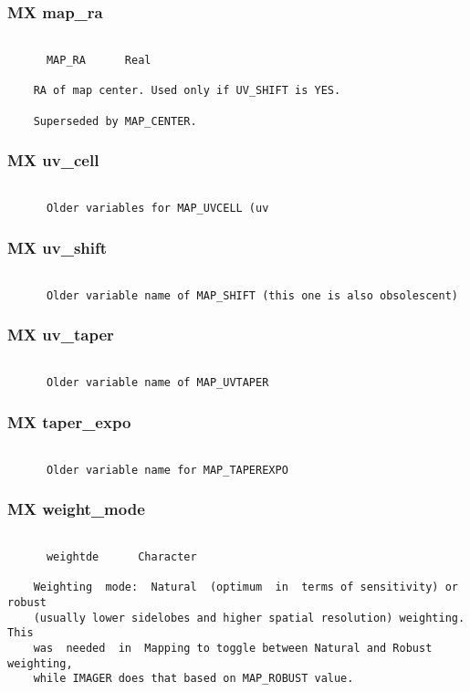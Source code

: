 \subsubsection{MX map\_ra}
\begin{verbatim}

      MAP_RA      Real

    RA of map center. Used only if UV_SHIFT is YES.

    Superseded by MAP_CENTER.

\end{verbatim}
\subsubsection{MX uv\_cell}
\begin{verbatim}

      Older variables for MAP_UVCELL (uv
\end{verbatim}
\subsubsection{MX uv\_shift}
\begin{verbatim}

      Older variable name of MAP_SHIFT (this one is also obsolescent)

\end{verbatim}
\subsubsection{MX uv\_taper}
\begin{verbatim}

      Older variable name of MAP_UVTAPER

\end{verbatim}
\subsubsection{MX taper\_expo}
\begin{verbatim}

      Older variable name for MAP_TAPEREXPO

\end{verbatim}
\subsubsection{MX weight\_mode}
\begin{verbatim}

      weightde      Character

    Weighting  mode:  Natural  (optimum  in  terms of sensitivity) or robust
    (usually lower sidelobes and higher spatial resolution) weighting.  This
    was  needed  in  Mapping to toggle between Natural and Robust weighting,
    while IMAGER does that based on MAP_ROBUST value.






\end{verbatim}

